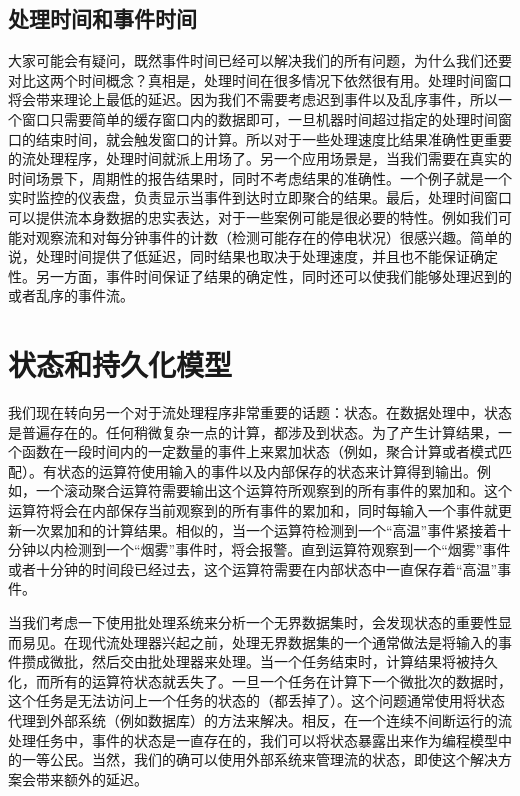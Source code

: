 \documentclass[cn,11pt,chinese]{elegantbook}
\begin{document}
\subsection{处理时间和事件时间}

大家可能会有疑问，既然事件时间已经可以解决我们的所有问题，为什么我们还要对比这两个时间概念？真相是，处理时间在很多情况下依然很有用。处理时间窗口将会带来理论上最低的延迟。因为我们不需要考虑迟到事件以及乱序事件，所以一个窗口只需要简单的缓存窗口内的数据即可，一旦机器时间超过指定的处理时间窗口的结束时间，就会触发窗口的计算。所以对于一些处理速度比结果准确性更重要的流处理程序，处理时间就派上用场了。另一个应用场景是，当我们需要在真实的时间场景下，周期性的报告结果时，同时不考虑结果的准确性。一个例子就是一个实时监控的仪表盘，负责显示当事件到达时立即聚合的结果。最后，处理时间窗口可以提供流本身数据的忠实表达，对于一些案例可能是很必要的特性。例如我们可能对观察流和对每分钟事件的计数（检测可能存在的停电状况）很感兴趣。简单的说，处理时间提供了低延迟，同时结果也取决于处理速度，并且也不能保证确定性。另一方面，事件时间保证了结果的确定性，同时还可以使我们能够处理迟到的或者乱序的事件流。

\section{状态和持久化模型}

我们现在转向另一个对于流处理程序非常重要的话题：状态。在数据处理中，状态是普遍存在的。任何稍微复杂一点的计算，都涉及到状态。为了产生计算结果，一个函数在一段时间内的一定数量的事件上来累加状态（例如，聚合计算或者模式匹配）。有状态的运算符使用输入的事件以及内部保存的状态来计算得到输出。例如，一个滚动聚合运算符需要输出这个运算符所观察到的所有事件的累加和。这个运算符将会在内部保存当前观察到的所有事件的累加和，同时每输入一个事件就更新一次累加和的计算结果。相似的，当一个运算符检测到一个“高温”事件紧接着十分钟以内检测到一个“烟雾”事件时，将会报警。直到运算符观察到一个“烟雾”事件或者十分钟的时间段已经过去，这个运算符需要在内部状态中一直保存着“高温”事件。

当我们考虑一下使用批处理系统来分析一个无界数据集时，会发现状态的重要性显而易见。在现代流处理器兴起之前，处理无界数据集的一个通常做法是将输入的事件攒成微批，然后交由批处理器来处理。当一个任务结束时，计算结果将被持久化，而所有的运算符状态就丢失了。一旦一个任务在计算下一个微批次的数据时，这个任务是无法访问上一个任务的状态的（都丢掉了）。这个问题通常使用将状态代理到外部系统（例如数据库）的方法来解决。相反，在一个连续不间断运行的流处理任务中，事件的状态是一直存在的，我们可以将状态暴露出来作为编程模型中的一等公民。当然，我们的确可以使用外部系统来管理流的状态，即使这个解决方案会带来额外的延迟。
\end{document}
